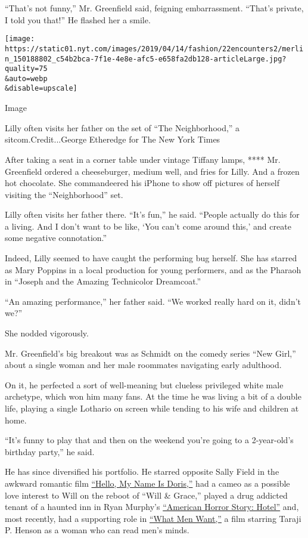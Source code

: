 ``That's not funny,'' Mr. Greenfield said, feigning embarrassment.
``That's private, I told you that!'' He flashed her a smile.

\texttt{[image: https://static01.nyt.com/images/2019/04/14/fashion/22encounters2/merlin\_150188802\_c54b2bca-7f1e-4e8e-afc5-e658fa2db128-articleLarge.jpg?quality=75\\\&auto=webp\\\&disable=upscale]}

Image

Lilly often visits her father on the set of ``The Neighborhood,'' a
sitcom.Credit...George Etheredge for The New York Times

After taking a seat in a corner table under vintage Tiffany lamps, ****
Mr. Greenfield ordered a cheeseburger, medium well, and fries for Lilly.
And a frozen hot chocolate. She commandeered his iPhone to show off
pictures of herself visiting the ``Neighborhood'' set.

Lilly often visits her father there. ``It's fun,'' he said. ``People
actually do this for a living. And I don't want to be like, `You can't
come around this,' and create some negative connotation.''

Indeed, Lilly seemed to have caught the performing bug herself. She has
starred as Mary Poppins in a local production for young performers, and
as the Pharaoh in ``Joseph and the Amazing Technicolor Dreamcoat.''

``An amazing performance,'' her father said. ``We worked really hard on
it, didn't we?''

She nodded vigorously.

Mr. Greenfield's big breakout was as Schmidt on the comedy series ``New
Girl,'' about a single woman and her male roommates navigating early
adulthood.

On it, he perfected a sort of well-meaning but clueless privileged white
male archetype, which won him many fans. At the time he was living a bit
of a double life, playing a single Lothario on screen while tending to
his wife and children at home.

``It's funny to play that and then on the weekend you're going to a
2-year-old's birthday party,'' he said.

He has since diversified his portfolio. He starred opposite Sally Field
in the awkward romantic film
\href{https://www.nytimes.com/2016/03/11/movies/sally-field-hello-my-name-is-doris-review.html}{``Hello,
My Name Is Doris,''} had a cameo as a possible love interest to Will on
the reboot of ``Will \& Grace,'' played a drug addicted tenant of a
haunted inn in Ryan Murphy's
\href{https://www.nytimes.com/2015/10/07/arts/television/review-american-horror-story-hotel-as-depraved-as-ever.html}{``American
Horror Story: Hotel''} and, most recently, had a supporting role in
\href{https://www.nytimes.com/2019/02/07/movies/what-men-want-review.html}{``What
Men Want,''} a film starring Taraji P. Henson as a woman who can read
men's minds.

